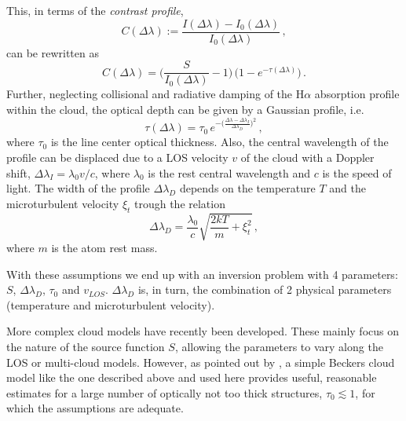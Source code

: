 This, in terms of the \emph{contrast profile},
\begin{equation}
C(\Delta \lambda):= \frac{I(\Delta \lambda)-I_{0}(\Delta \lambda)}{I_{0}(\Delta \lambda)}\,,
\label{eq:contrast}
\end{equation}
can be rewritten as
\begin{equation}
C(\Delta \lambda)=\Bigg (\frac{S}{I_{0}(\Delta \lambda)}-1\Bigg ) \, \Big(1-e^{-\tau(\Delta \lambda)}\Big)\,.
\label{eq:contrast}
\end{equation}
Further, neglecting collisional and radiative damping of the H$\alpha$ absorption profile within the cloud, the optical depth can be given by a Gaussian profile, i.e.
\begin{equation}
\tau(\Delta \lambda)=\tau_{0}\,e^{-\Big(\frac{\Delta \lambda-\Delta \lambda_{I}}{\Delta \lambda_{D}}\Big)^2}\,,
\label{eq:cloud:gausian}
\end{equation} 
where $\tau_{0}$ is the line center optical thickness. Also, the  central wavelength of the profile can be displaced due to a LOS velocity $v$ of the cloud with a Doppler shift, $\Delta \lambda_{I}=\lambda_{0}v/c$, where $\lambda_{0}$ is the rest central wavelength and $c$ is the speed of light. The width of the profile $\Delta \lambda_{D}$ depends on the temperature $T$ and the microturbulent velocity $\xi_{t}$ trough the relation 
\begin{equation}
\Delta \lambda_{D}=\frac{\lambda_{0}}{c}\sqrt{\frac{2kT}{m}+\xi_{t}^{2}}\, ,
\label{eq:cloud:width}
\end{equation} 
where $m$ is the atom rest mass.

With these assumptions we end up with an inversion problem with 4 parameters: $S$, $\Delta \lambda_{D}$, $\tau_{0}$ and $v_{LOS}$. $\Delta \lambda_{D}$ is, in turn, the combination of 2 physical parameters (temperature and microturbulent velocity).  

More complex cloud models have recently been developed. These mainly focus on the nature of the source function $S$, allowing the parameters to vary along the LOS or multi-cloud models. However, as pointed out by \cite{1990A&A...230..200A}, a simple Beckers cloud model like the one described above and used here provides useful, reasonable estimates for a large number of optically not too thick structures, $\tau_{0} \lesssim 1$, for which the assumptions are adequate.

